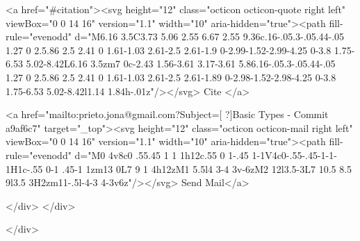       <a  href="#citation"><svg height="12" class="octicon octicon-quote right left" viewBox="0 0 14 16" version="1.1" width="10" aria-hidden="true"><path fill-rule="evenodd" d="M6.16 3.5C3.73 5.06 2.55 6.67 2.55 9.36c.16-.05.3-.05.44-.05 1.27 0 2.5.86 2.5 2.41 0 1.61-1.03 2.61-2.5 2.61-1.9 0-2.99-1.52-2.99-4.25 0-3.8 1.75-6.53 5.02-8.42L6.16 3.5zm7 0c-2.43 1.56-3.61 3.17-3.61 5.86.16-.05.3-.05.44-.05 1.27 0 2.5.86 2.5 2.41 0 1.61-1.03 2.61-2.5 2.61-1.89 0-2.98-1.52-2.98-4.25 0-3.8 1.75-6.53 5.02-8.42l1.14 1.84h-.01z"/></svg> Cite
      </a>

      <a href="mailto:prieto.jona@gmail.com?Subject=[ ?]Basic Types - Commit a9af6c7" target="_top"><svg height="12" class="octicon octicon-mail right left" viewBox="0 0 14 16" version="1.1" width="10" aria-hidden="true"><path fill-rule="evenodd" d="M0 4v8c0 .55.45 1 1 1h12c.55 0 1-.45 1-1V4c0-.55-.45-1-1-1H1c-.55 0-1 .45-1 1zm13 0L7 9 1 4h12zM1 5.5l4 3-4 3v-6zM2 12l3.5-3L7 10.5 8.5 9l3.5 3H2zm11-.5l-4-3 4-3v6z"/></svg> Send Mail</a>

    </div>
  </div>

</div>




